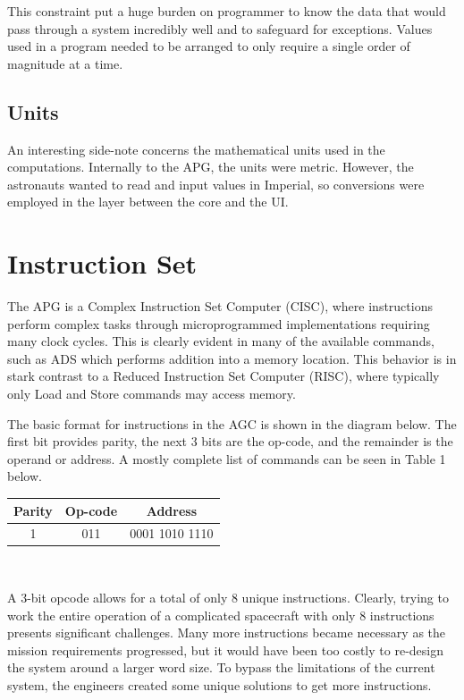 \documentclass[a4paper,11pt]{article}
\begin{document}
This constraint put a huge burden on programmer to know the data that would pass through a system incredibly well and to safeguard for exceptions.  Values used in a program needed to be arranged to only require a single order of magnitude at a time.

\subsection{Units}
An interesting side-note concerns the mathematical units used in the computations.  Internally to the APG, the units were metric.  However, the astronauts wanted to read and input values in Imperial, so conversions were employed in the layer between the core and the UI. 


\section{Instruction Set}
The APG is a Complex Instruction Set Computer (CISC), where instructions perform complex tasks through microprogrammed implementations requiring many clock cycles.  This is clearly evident in many of the available commands, such as ADS which performs addition into a memory location.  This behavior is in stark contrast to a Reduced Instruction Set Computer (RISC), where typically only Load and Store commands may access memory.  

The basic format for instructions in the AGC is shown in the diagram below.  The first bit provides parity, the next 3 bits are the op-code, and the remainder is the operand or address.  A mostly complete list of commands can be seen in Table 1 below.

\begin{center}
\begin{tabular}{| c | c | c |}
  \hline	
  	Parity & Op-code & Address \\ \hline \hline
	1 & 011 & 0001 1010 1110 \\ \hline
\end{tabular} \\
\end{center}

A 3-bit opcode allows for a total of only 8 unique instructions.  Clearly, trying to work the entire operation of a complicated spacecraft with only 8 instructions presents significant challenges.  Many more instructions became necessary as the mission requirements progressed, but it would have been too costly to re-design the system around a larger word size.  To bypass the limitations of the current system, the engineers created some unique solutions to get more instructions.
\end{document}
